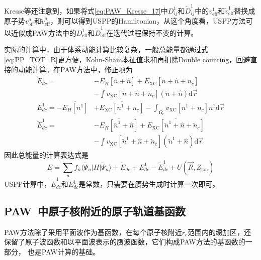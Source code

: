 \textrm{Kresse}等还注意到，如果将式\eqref{eq:PAW_Kresse_17}中$D_{ij}^1$和$\tilde D_{ij}^1$中的$v_{\mathrm{eff}}^1$和$\tilde v_{\mathrm{eff}}^1$替换成原子势$v_{\mathrm{eff}}^a$和$\tilde v_{\mathrm{eff}}^a$，则可以得到\textrm{USPP}的\textrm{Hamiltonian}，从这个角度看，\textrm{USPP}方法可以近似成\textrm{PAW}方法中的$D_{\mathrm{eff}}^1$和$\tilde D_{\mathrm{eff}}^1$在迭代过程保持不变的计算。
%

实际的计算中，由于体系动能计算比较复杂，一般总能量都通过式\eqref{eq:PP_TOT_R}更方便，\textrm{Kohn-Sham}本征值求和再扣除\textrm{Double counting}，回避直接的动能计算。在\textrm{PAW}方法中，修正项为
	\begin{equation}
		\begin{aligned}
			\tilde E_{dc}=&-E_H[\tilde n+\hat n]+E_{\mathrm{XC}}[\tilde n+\hat n+\tilde n_c]\\
			&-\int v_{\mathrm{XC}}[\tilde n+\hat n+\tilde n_c](\tilde n+\hat n)\mathrm{d}\vec r\\
			E_{dc}^1=-\overline{E_H[n^1]}&+\overline{E_{\mathrm{XC}}[n^1+n_c]}-\int_{\Omega_r}v_{\mathrm{XC}}[n^1+n_c]n^1\mathrm{d}\vec r\\
			\tilde E_{dc}^1=&-\overline{E_H[\tilde n^1+\hat n]}+\overline{E_{\mathrm{XC}}[\tilde n^1+\hat n+\tilde n_c]}\\
			&-\int v_{\mathrm{XC}}[\tilde n^1+\hat n+\tilde n_c](\tilde n^1+\hat n)\mathrm{d}\vec r
		\end{aligned}
	\end{equation}
因此总能量的计算表达式是
	$$E=\sum_nf_n\langle\tilde\Psi_n|H|\tilde\Psi_n\rangle+\tilde E_{dc}+E_{dc}^1-\tilde E_{dc}^1+U(\vec R,Z_{\mathrm{ion}})$$
\textrm{USPP}计算中，$\tilde E_{dc}^1$和$E_{dc}^1$是常数，只需要在赝势生成时计算一次即可。

\subsection{PAW~中原子核附近的原子轨道基函数}
\textrm{PAW}方法除了采用平面波作为基函数，在每个原子核附近$r_c$范围内的缀加区，还保留了原子波函数和以平面波表示的赝波函数，它们构成\textrm{PAW}方法的基函数的一部分，%
也是\textrm{PAW}计算的基础。

